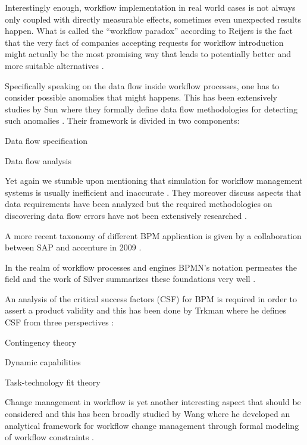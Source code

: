 \documentclass{seal_thesis}
\begin{document}
Interestingly enough, workflow implementation in real world cases is not always only coupled with directly measurable effects, sometimes even unexpected results happen. What is called the ``workflow paradox'' according to Reijers is the fact that the very fact of companies accepting requests for workflow introduction might actually be the most promising way that leads to potentially better and more suitable alternatives \cite{Reijers2005}.

Specifically speaking on the data flow inside workflow processes, one has to consider possible anomalies that might happens. This has been extensively studies by Sun \etal where they formally define data flow methodologies for detecting such anomalies \cite{Sun2006}. Their framework is divided in two components:
\begin{enumerate*}
	\item Data flow specification
	\item Data flow analysis
\end{enumerate*}

Yet again we stumble upon mentioning that simulation for workflow management systems is usually inefficient and inaccurate \cite{Sun2006}. They moreover discuss aspects that data requirements have been analyzed but the required methodologies on discovering data flow errors have not been extensively researched \cite{Sun2006}.

A more recent taxonomy of different BPM application is given by a collaboration between SAP and accenture in 2009 \cite{EvolvedTechnologist2009}.

In the realm of workflow processes and engines BPMN's notation permeates the field and the work of Silver summarizes these foundations very well \cite{Silver2011}.

An analysis of the critical success factors (CSF) for BPM is required in order to assert a product validity and this has been done by Trkman where he defines CSF from three perspectives \cite{Trkman2010}:
\begin{enumerate*}
	\item Contingency theory
	\item Dynamic capabilities
	\item Task-technology fit theory
\end{enumerate*}


Change management in workflow is yet another interesting aspect that should be considered and this has been broadly studied by Wang where he developed an analytical framework for workflow change management through formal modeling of workflow constraints \cite{Wang2011}.
\end{document}
